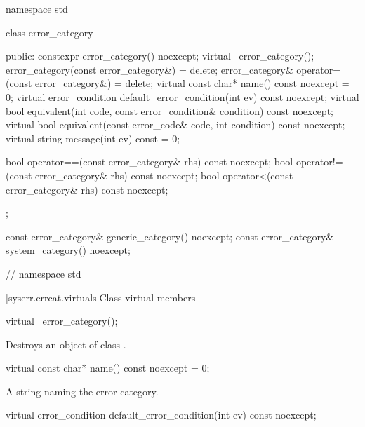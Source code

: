 %
%
%
\begin{codeblock}
namespace std {
  class error_category {
  public:
    constexpr error_category() noexcept;
    virtual ~error_category();
    error_category(const error_category&) = delete;
    error_category& operator=(const error_category&) = delete;
    virtual const char* name() const noexcept = 0;
    virtual error_condition default_error_condition(int ev) const noexcept;
    virtual bool equivalent(int code, const error_condition& condition) const noexcept;
    virtual bool equivalent(const error_code& code, int condition) const noexcept;
    virtual string message(int ev) const = 0;
    
    bool operator==(const error_category& rhs) const noexcept;
    bool operator!=(const error_category& rhs) const noexcept;
    bool operator<(const error_category& rhs) const noexcept;
  };

  const error_category& generic_category() noexcept;
  const error_category& system_category() noexcept;

}   // namespace std
\end{codeblock}

[syserr.errcat.virtuals]{Class  virtual members}

%
\begin{itemdecl}
virtual ~error_category();
\end{itemdecl}

\begin{itemdescr}
\pnum
\effects Destroys an object of class .
\end{itemdescr}

\begin{itemdecl}
virtual const char* name() const noexcept = 0;
\end{itemdecl}

\begin{itemdescr}
\pnum
\returns A string naming the error category.
\end{itemdescr}

\begin{itemdecl}
virtual error_condition default_error_condition(int ev) const noexcept;
\end{itemdecl}

